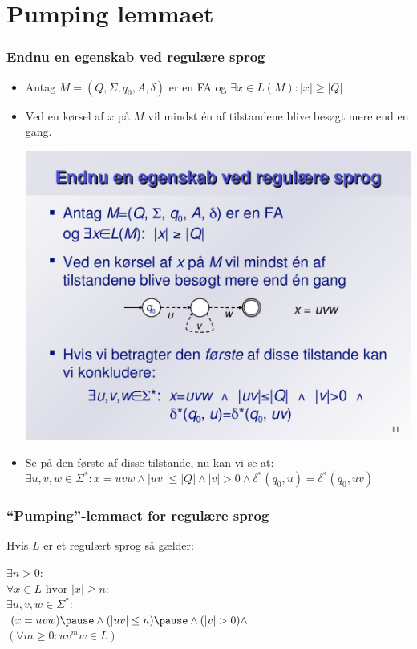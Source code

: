 \documentclass{beamer}
\begin{document}
\section{Pumping lemmaet}
\begin{frame}
\frametitle{Endnu en egenskab ved regulære sprog}
\begin{itemize}[<+->]
\item Antag $M=(Q, \Sigma, q_0, A, \delta)$ er en FA og $\exists x\in L(M): |x| \geq |Q|$
\item Ved en kørsel af $x$ på $M$ vil mindst én af tilstandene blive
  besøgt mere end en gang.
    \begin{center}
    \includegraphics[scale=.40]{images/pumping}
    \end{center}
\item Se på den første af disse tilstande, nu kan vi se at:
  $\exists u,v,w\in \Sigma^*: x=uvw \wedge |uv| \leq |Q| \wedge |v|>0 \wedge
  \delta^*(q_0,u)=\delta^*(q_0,uv)$
\end{itemize}
\end{frame}
\begin{frame}
\frametitle{``Pumping''-lemmaet for regulære sprog}
Hvis $L$ er et regulært sprog så gælder:

\hspace{1cm}$\exists n>0:$\\
\pause
\hspace{2cm}$\forall x\in L \text{ hvor } |x| \geq n:$\\
\pause
\hspace{3cm}$\exists u,v,w\in \Sigma^*:$\\
\pause
\hspace{4cm}$(x = uvw) \pause \wedge (|uv|\leq n) \pause \wedge (|v| > 0) \wedge$\\
\pause
\hspace{4cm}$(\forall m\geq 0: uv^mw\in L)$\\
\pause
\end{frame}
\end{document}
